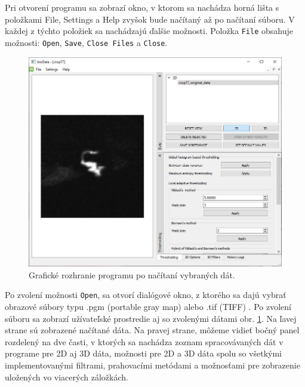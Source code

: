 \documentclass[a4paper,11pt,oneside]{article}%
\begin{document}
Pri otvorení programu sa zobrazí okno, v ktorom sa nachádza horná lišta s položkami File, Settings a Help zvyšok bude načítaný až po načítaní súboru. V každej z týchto položiek sa nachádzajú ďalšie možnosti. Položka \texttt{File} obsahuje možnosti: \texttt{Open}, \texttt{Save}, \texttt{Close Files} a \texttt{Close}.

\begin{figure}[H]
 \begin{center} 
 \includegraphics[scale=0.50]{pics/ui1.jpg}
\caption{Grafické rozhranie programu po načítaní vybraných dát.}
\label{fig:ui1}
\end{center} 
\end{figure}

Po zvolení možnosti \texttt{Open}, sa otvorí dialógové okno, z ktorého sa dajú vybrať obrazové súbory typu .pgm (portable gray map) alebo .tif (TIFF) . Po zvolení súboru sa zobrazí užívateľské prostredie aj so zvolenými dátami obr. \ref{fig:ui1}. Na ľavej strane sú zobrazené načítané dáta. Na pravej strane, môžeme vidieť bočný panel rozdelený na dve časti, v ktorých sa nachádza zoznam spracovávaných dát v programe pre 2D aj 3D dáta, možnosti pre 2D a 3D dáta spolu so všetkými implementovanými filtrami, prahovacími metódami a možnosťami pre zobrazenie uložených vo viacerých záložkách. 
\end{document}

